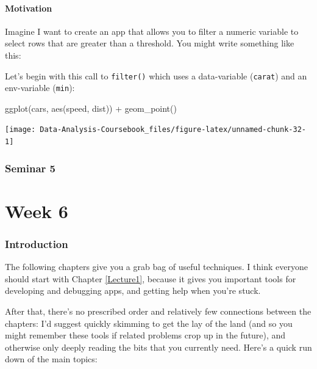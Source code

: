 \documentclass[
]{article}
\newenvironment{Shaded}{\begin{snugshade}}{\end{snugshade}}
\newcommand{\FunctionTok}[1]{\textcolor[rgb]{0.00,0.00,0.00}{#1}}
\newcommand{\NormalTok}[1]{#1}
\newcommand{\SpecialCharTok}[1]{\textcolor[rgb]{0.00,0.00,0.00}{#1}}
\begin{document}
\hypertarget{tidy-motivation}{%
\subsection{Motivation}\label{tidy-motivation}}

Imagine I want to create an app that allows you to filter a numeric variable to select rows that are greater than a threshold.
You might write something like this:

Let's begin with this call to \texttt{filter()} which uses a data-variable (\texttt{carat}) and an env-variable (\texttt{min}):

\begin{Shaded}
\begin{Highlighting}[]
\FunctionTok{ggplot}\NormalTok{(cars, }\FunctionTok{aes}\NormalTok{(speed, dist)) }\SpecialCharTok{+} 
  \FunctionTok{geom\_point}\NormalTok{()}
\end{Highlighting}
\end{Shaded}

\begin{center}\texttt{[image: Data-Analysis-Coursebook\_files/figure-latex/unnamed-chunk-32-1]} \end{center}

\hypertarget{seminar5}{%
\section{Seminar 5}\label{seminar5}}

\hypertarget{part-week-6}{%
\part*{Week 6}\label{part-week-6}}

\hypertarget{week6-intro}{%
\section*{Introduction}\label{week6-intro}}

The following chapters give you a grab bag of useful techniques.
I think everyone should start with Chapter \ref{Lecture1}, because it gives you important tools for developing and debugging apps, and getting help when you're stuck.

After that, there's no prescribed order and relatively few connections between the chapters: I'd suggest quickly skimming to get the lay of the land (and so you might remember these tools if related problems crop up in the future), and otherwise only deeply reading the bits that you currently need.
Here's a quick run down of the main topics:
\end{document}
